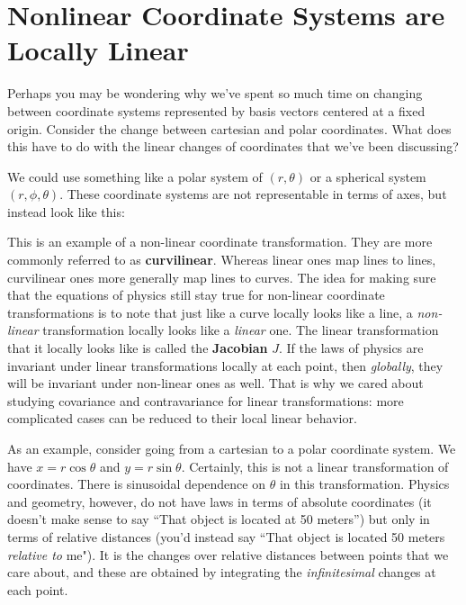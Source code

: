 
	\section[Nonlinear Coordinate Systems are Locally Linear]{Nonlinear Coordinate Systems are\\ Locally Linear}%
	\label{sec:nonlinear_coordinate_systems_are_locally_linear}
	
	Perhaps you may be wondering why we've spent so much time on changing between coordinate systems represented by basis vectors centered at a fixed origin. Consider the change between cartesian and polar coordinates. What does this have to do with the linear changes of coordinates that we've been discussing?
	
	We could use something like a polar system of $(r,\theta)$ or a spherical system $(r, \phi, \theta)$. These coordinate systems are not representable in terms of axes, but instead look like this:
	
	
	This is an example of a non-linear coordinate transformation. They are more commonly referred to as \textbf{curvilinear}. Whereas linear ones map lines to lines, curvilinear ones more generally map lines to curves. The idea for making sure that the equations of physics still stay true for non-linear coordinate transformations is to note that just like a curve locally looks like a line, a \emph{non-linear} transformation locally looks like a \emph{linear} one. The linear transformation that it locally looks like is called the \textbf{Jacobian}  $J$. If the laws of physics are invariant under linear transformations locally at each point, then \emph{globally}, they will be invariant under non-linear ones as well. That is why we cared about studying covariance and contravariance for linear transformations: more complicated cases can be reduced to their local linear behavior.
	
	As an example, consider going from a cartesian to a polar coordinate system. We have $x = r \cos \theta$ and $y = r \sin \theta$. Certainly, this is not a linear transformation of coordinates. There is sinusoidal dependence on $\theta$ in this transformation. Physics and geometry, however, do not have laws in terms of absolute coordinates (it doesn't make sense to say ``That object is located at 50 meters'') but only in terms of relative distances (you'd instead say ``That object is located 50 meters \emph{relative to} me"). It is the changes over relative distances between points that we care about, and these are obtained by integrating the \emph{infinitesimal} changes at each point. 
	
